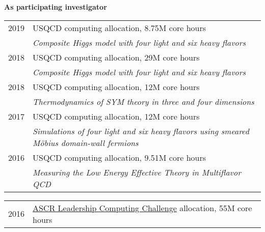 \begin{spacelist}
  \vspace{18 pt}
  \item {\large \bfseries As participating investigator} \\[10 pt]
    \begin{tabular}[t]{cl}
      2019 & USQCD computing allocation, 8.75M core hours                                                                                                      \\ %
           & \textit{Composite Higgs model with four light and six heavy flavors}                                                                              \\[6 pt]
      2018 & USQCD computing allocation, 29M core hours                                                                                                        \\ %
           & \textit{Composite Higgs model with four light and six heavy flavors}                                                                              \\[6 pt]
      2018 & USQCD computing allocation, 12M core hours                                                                                                        \\ %
           & \textit{Thermodynamics of SYM theory in three and four dimensions}                                                                                \\[6 pt]
      2017 & USQCD computing allocation, 12M core hours                                                                                                        \\ %
           & \textit{Simulations of four light and six heavy flavors using smeared M\"obius domain-wall fermions}                                              \\[6 pt]
      2016 & USQCD computing allocation, 9.51M core hours                                                                                                      \\ %
           & \textit{Measuring the Low Energy Effective Theory in Multiflavor QCD}                                                                             \\[6 pt]
    \end{tabular} %
    \begin{tabular}[t]{cl}
      2016 & \href{https://science.energy.gov/ascr/facilities/accessing-ascr-facilities/alcc/}{ASCR Leadership Computing Challenge} allocation, 55M core hours \\ %

\end{tabular}
\end{spacelist}
